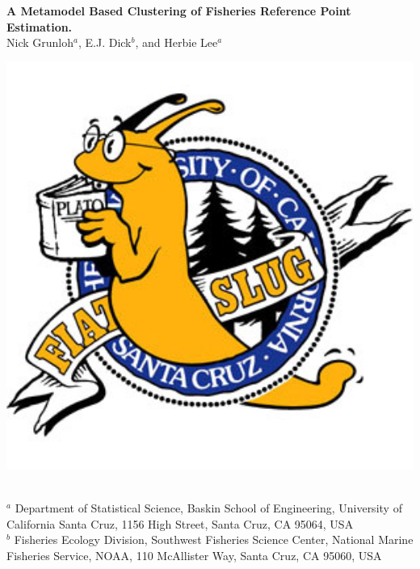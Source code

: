 \documentclass[a0paper,portrait]{baposter}
\begin{document}
\begin{poster}
{\begin{minipage}{0.14\textwidth}
\end{minipage}
\begin{minipage}{0.7\textwidth}
	\begin{center}
	{\huge \textbf{A Metamodel Based Clustering of Fisheries Reference Point Estimation.}}\\ %
	\vspace{0.5cm}
	{\Large Nick Grunloh$^a$, E.J. Dick$^b$, and Herbie Lee$^a$}
	\end{center}
\end{minipage}
\begin{minipage}{0.14\textwidth}
	\hspace*{-0.5cm}
	\includegraphics[width=1.2\textwidth]{./fiatSlug.jpg}
\end{minipage}
\normalsize
\\ \sf
$^a$ Department of Statistical Science, Baskin School of Engineering, University of California Santa Cruz, 1156 High Street, Santa Cruz, CA 95064, USA\\
$^b$ Fisheries Ecology Division, Southwest Fisheries Science Center, National Marine Fisheries Service, NOAA, 110 McAllister Way, Santa Cruz, CA 95060, USA\\
}
\\


\end{poster}
\end{document}
